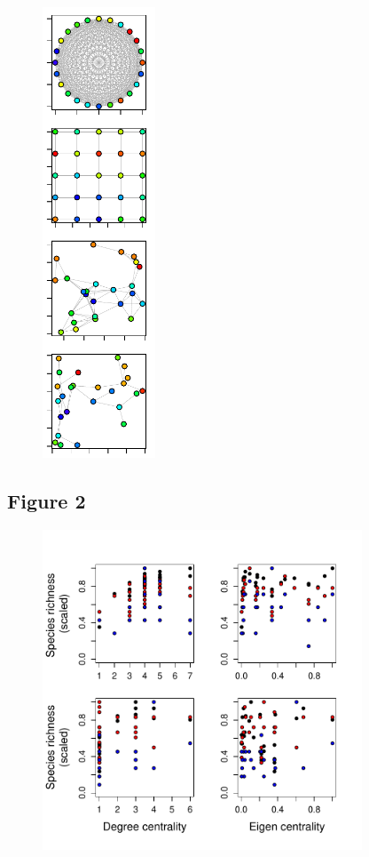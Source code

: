 \documentclass[12pt]{article}
\begin{document}
\begin{figure}[ht!]
	\centering\includegraphics[width=0.3\textwidth]{Networks.pdf}
\end{figure}

\newpage


\subsection*{Figure 2}

\begin{figure}[ht!]
	\centering\includegraphics[width=0.85\textwidth]{Centrality.pdf}
\end{figure}
\end{document}
